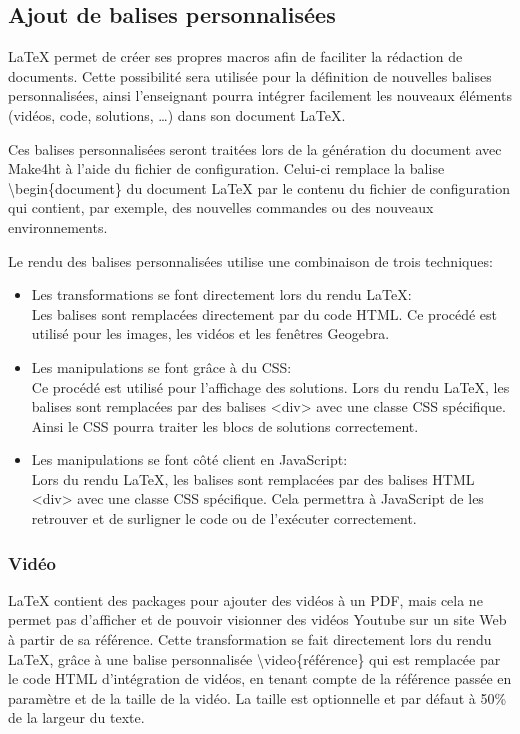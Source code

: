 \documentclass[12pt,titlepage,oneside]{article}
\begin{document}
\newpage

\subsection{Ajout de balises personnalisées}
LaTeX permet de créer ses propres macros afin de faciliter la rédaction de documents. Cette possibilité sera utilisée pour la définition de nouvelles balises personnalisées, ainsi l'enseignant pourra intégrer facilement les nouveaux éléments (vidéos, code, solutions, \dots) dans son document LaTeX.\par
Ces balises personnalisées seront traitées lors de la génération du document avec Make4ht à l'aide du fichier de configuration. Celui-ci remplace la balise \textbackslash begin\{document\} du document LaTeX par le contenu du fichier de configuration qui contient, par exemple, des nouvelles commandes ou des nouveaux environnements.\par
Le rendu des balises personnalisées utilise une combinaison de trois techniques:
\begin{itemize}
\item Les transformations se font directement lors du rendu LaTeX:\\
Les balises sont remplacées directement par du code HTML. Ce procédé est utilisé pour les images, les vidéos et les fenêtres Geogebra.
\item Les manipulations se font grâce à du CSS:\\
Ce procédé est utilisé pour l'affichage des solutions. Lors du rendu LaTeX, les balises sont remplacées par des balises <div> avec une classe CSS spécifique. Ainsi le CSS pourra traiter les blocs de solutions correctement.
\item Les manipulations se font côté client en JavaScript:\\
Lors du rendu LaTeX, les balises sont remplacées par des balises HTML <div> avec une classe CSS spécifique. Cela permettra à JavaScript de les retrouver et de surligner le code ou de l'exécuter correctement.
\end{itemize}

\subsubsection{Vidéo}
LaTeX contient des packages pour ajouter des vidéos à un PDF, mais cela ne permet pas d'afficher et de pouvoir visionner des vidéos Youtube sur un site Web à partir de sa référence. Cette transformation se fait directement lors du rendu LaTeX, grâce à une balise personnalisée \textbackslash video\{référence\} qui est remplacée par le code HTML d'intégration de vidéos, en tenant compte de la référence passée en paramètre et de la taille de la vidéo. La taille est optionnelle et par défaut à 50\% de la largeur du texte.\par
\end{document}
